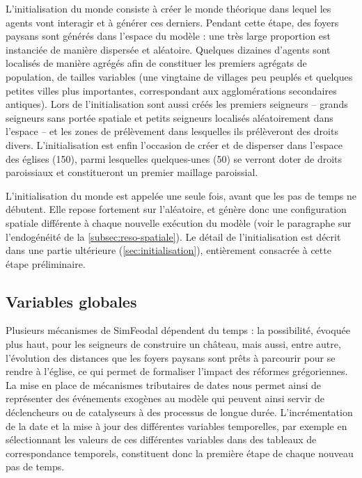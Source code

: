 L'initialisation du monde consiste à créer le monde théorique dans lequel les agents vont interagir et à générer ces derniers.
Pendant cette étape, des foyers paysans sont générés dans l'espace du modèle :  une très large proportion est instanciée de manière dispersée et aléatoire.
Quelques dizaines d'agents sont localisés de manière agrégés afin de constituer les premiers agrégats de population, de tailles variables (une vingtaine de villages peu peuplés et quelques petites villes plus importantes, correspondant aux agglomérations secondaires antiques).
Lors de l'initialisation sont aussi créés les premiers seigneurs -- grands seigneurs sans portée spatiale et petits seigneurs localisés aléatoirement dans l'espace -- et les zones de prélèvement dans lesquelles ils prélèveront des droits divers.
L'initialisation est enfin l'occasion de créer et de disperser dans l'espace des églises (150), parmi lesquelles quelques-unes (50) se verront doter de droits paroissiaux et constitueront un premier maillage paroissial.

L'initialisation du monde est appelée une seule fois, avant que les pas de temps ne débutent.
Elle repose fortement sur l'aléatoire, et génère donc une configuration spatiale différente à chaque nouvelle exécution du modèle (voir le paragraphe sur l'endogénéité de la \cref{subsec:reso-spatiale}).
Le détail de l'initialisation est décrit dans une partie ultérieure (\cref{sec:initialisation}), entièrement consacrée à cette étape préliminaire.

\subsection{Variables globales \label{meca-variables}}

Plusieurs mécanismes de SimFeodal dépendent du temps :
la possibilité, évoquée plus haut, pour les seigneurs de construire un château, mais aussi, entre autre, l'évolution des distances que les foyers paysans sont prêts à parcourir pour se rendre à l'église, ce qui permet de formaliser l'impact des réformes grégoriennes.
La mise en place de mécanismes tributaires de dates nous permet ainsi de représenter des événements exogènes au modèle qui peuvent ainsi servir de déclencheurs ou de catalyseurs à des processus de longue durée.
L'incrémentation de la date et la mise à jour des différentes variables temporelles, par exemple en sélectionnant les valeurs de ces différentes variables dans des tableaux de correspondance temporels, constituent donc la première étape de chaque nouveau pas de temps.

